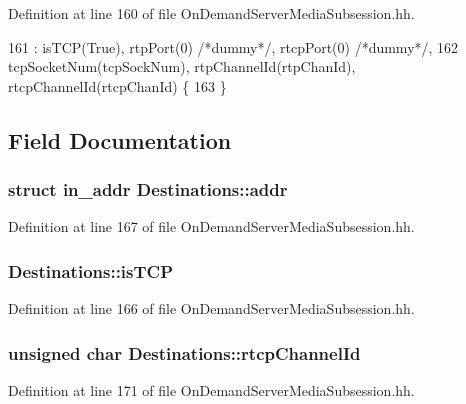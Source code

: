 Definition at line 160 of file On\+Demand\+Server\+Media\+Subsession.\+hh.


\begin{DoxyCode}
161     : isTCP(True), rtpPort(0) \textcolor{comment}{/*dummy*/}, rtcpPort(0) \textcolor{comment}{/*dummy*/},
162       tcpSocketNum(tcpSockNum), rtpChannelId(rtpChanId), rtcpChannelId(rtcpChanId) \{
163   \}
\end{DoxyCode}


\subsection{Field Documentation}
\subsubsection[{addr}]{\setlength{\rightskip}{0pt plus 5cm}struct in\+\_\+addr Destinations\+::addr}\label{classDestinations_a0e3d26c7c8157f833543b25ee7a9057d}


Definition at line 167 of file On\+Demand\+Server\+Media\+Subsession.\+hh.

\subsubsection[{is\+T\+C\+P}]{ Destinations\+::is\+T\+C\+P}\label{classDestinations_abab3aaeb007f3009aeb2410e5ff0ab24}


Definition at line 166 of file On\+Demand\+Server\+Media\+Subsession.\+hh.

\subsubsection[{rtcp\+Channel\+Id}]{\setlength{\rightskip}{0pt plus 5cm}unsigned char Destinations\+::rtcp\+Channel\+Id}\label{classDestinations_a252dcd4a8fc7cd2cf0b07f05f8feb033}


Definition at line 171 of file On\+Demand\+Server\+Media\+Subsession.\+hh.

